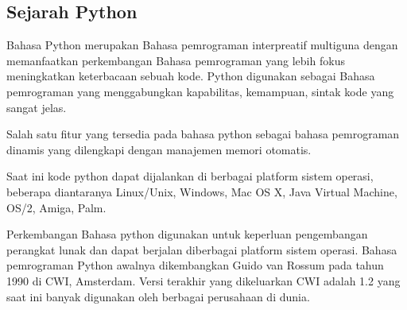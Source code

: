 \subsection{Sejarah Python}
Bahasa Python merupakan Bahasa pemrograman interpreatif multiguna dengan memanfaatkan perkembangan Bahasa pemrograman yang lebih fokus meningkatkan keterbacaan sebuah kode. Python digunakan sebagai Bahasa pemrograman yang menggabungkan kapabilitas, kemampuan, sintak kode yang sangat jelas.

Salah satu fitur yang tersedia pada bahasa python sebagai bahasa pemrograman dinamis yang dilengkapi dengan manajemen memori otomatis.

Saat ini kode python dapat dijalankan di berbagai platform sistem operasi, beberapa diantaranya Linux/Unix, Windows, Mac OS X, Java Virtual Machine, OS/2, Amiga, Palm.

Perkembangan Bahasa python digunakan untuk keperluan pengembangan perangkat lunak dan dapat berjalan diberbagai platform sistem operasi.
Bahasa pemrograman Python awalnya dikembangkan Guido van Rossum pada tahun 1990 di CWI, Amsterdam. Versi terakhir yang dikeluarkan CWI adalah 1.2 yang saat ini banyak digunakan oleh berbagai perusahaan di dunia.

